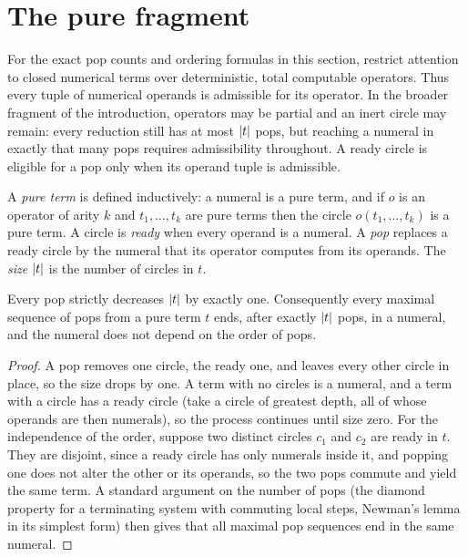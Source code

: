 \section{The pure fragment}\label{sec:pure}

For the exact pop counts and ordering formulas in this section, restrict attention to closed numerical terms over deterministic, total computable operators. Thus every tuple of numerical operands is admissible for its operator. In the broader fragment of the introduction, operators may be partial and an inert circle may remain: every reduction still has at most $\lvert t\rvert$ pops, but reaching a numeral in exactly that many pops requires admissibility throughout. A ready circle is eligible for a pop only when its operand tuple is admissible.

\begin{definition}
A \emph{pure term} is defined inductively: a numeral is a pure term, and if $o$ is an operator of arity $k$ and $t_1,\dots,t_k$ are pure terms then the circle $o(t_1,\dots,t_k)$ is a pure term. A circle is \emph{ready} when every operand is a numeral. A \emph{pop} replaces a ready circle by the numeral that its operator computes from its operands. The \emph{size} $\lvert t\rvert$ is the number of circles in $t$.
\end{definition}

\begin{proposition}\label{prop:pure-term}
Every pop strictly decreases $\lvert t\rvert$ by exactly one. Consequently every maximal sequence of pops from a pure term $t$ ends, after exactly $\lvert t\rvert$ pops, in a numeral, and the numeral does not depend on the order of pops.
\end{proposition}

\begin{proof}
A pop removes one circle, the ready one, and leaves every other circle in place, so the size drops by one. A term with no circles is a numeral, and a term with a circle has a ready circle (take a circle of greatest depth, all of whose operands are then numerals), so the process continues until size zero. For the independence of the order, suppose two distinct circles $c_1$ and $c_2$ are ready in $t$. They are disjoint, since a ready circle has only numerals inside it, and popping one does not alter the other or its operands, so the two pops commute and yield the same term. A standard argument on the number of pops (the diamond property for a terminating system with commuting local steps, Newman's lemma in its simplest form) then gives that all maximal pop sequences end in the same numeral.
\end{proof}


